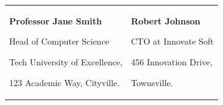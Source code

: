 

\begin{tabularx}{\textwidth}{@{}X X@{}}
\textbf{Professor Jane Smith}\par
Head of Computer Science\par
Tech University of Excellence,\par 
123 Academic Way, Cityville.\par 
\makefield{\faEnvelopeO}{\url{jane.smith@example.edu}}
& 
\textbf{Robert Johnson}\par
CTO at Innovate Soft\par
456 Innovation Drive,\par 
Townsville.\par 
\makefield{\faEnvelopeO}{\url{robert.johnson@example.com}}
\\
\end{tabularx}
